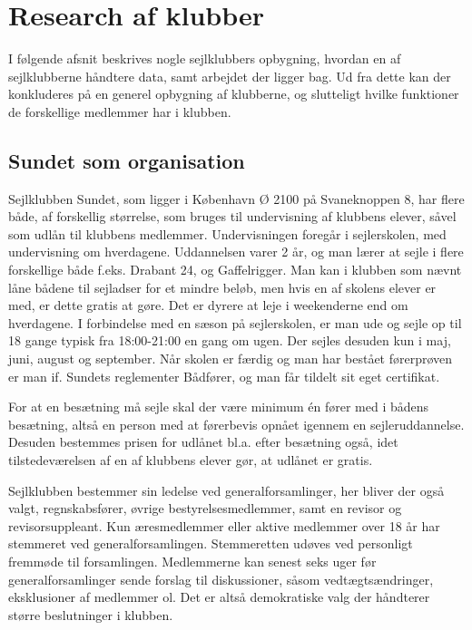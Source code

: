\section{Research af klubber}\label{sec:research}

I følgende afsnit beskrives nogle sejlklubbers opbygning, hvordan en af sejlklubberne håndtere data, samt arbejdet der
ligger bag. Ud fra dette kan der konkluderes på en generel opbygning af klubberne, og slutteligt hvilke funktioner de
forskellige medlemmer har i klubben.

\subsection{Sundet som organisation}

Sejlklubben Sundet, som ligger i København Ø 2100 på Svaneknoppen 8, har flere både, af forskellig størrelse, som bruges
til undervisning af klubbens elever, såvel som udlån til klubbens medlemmer. Undervisningen foregår i sejlerskolen, med
undervisning om hverdagene. Uddannelsen varer 2 år, og man lærer at sejle i flere forskellige både f.eks. Drabant 24, og
Gaffelrigger. Man kan i klubben som nævnt låne bådene
til sejladser for et mindre beløb, men hvis en af skolens elever er med, er dette gratis at gøre. Det er dyrere at leje
i weekenderne end om hverdagene. I forbindelse med en sæson på sejlerskolen, er man ude og sejle op til 18 gange typisk
fra 18:00-21:00 en gang om ugen. Der sejles desuden kun i maj, juni, august og september. Når skolen er færdig og man
har bestået førerprøven er man if. Sundets reglementer Bådfører, og man får tildelt sit eget certifikat.

For at en besætning må sejle skal der være minimum én fører med i bådens besætning, altså en person med at førerbevis
opnået igennem en sejleruddannelse. Desuden bestemmes prisen for udlånet bl.a. efter besætning også, idet
tilstedeværelsen af en af klubbens elever gør, at udlånet er gratis.\citep{Sundet}

Sejlklubben bestemmer sin ledelse ved generalforsamlinger, her bliver der også valgt, regnskabsfører, øvrige
bestyrelsesmedlemmer, samt en revisor og revisorsuppleant. Kun æresmedlemmer eller aktive medlemmer over 18 år har
stemmeret ved generalforsamlingen. Stemmeretten udøves ved personligt fremmøde til forsamlingen. Medlemmerne kan senest
seks uger før generalforsamlinger sende forslag til diskussioner, såsom vedtægtsændringer, eksklusioner af medlemmer
ol. Det er altså demokratiske valg der håndterer større beslutninger i klubben.


